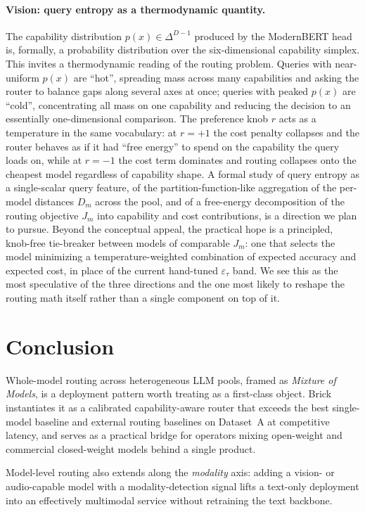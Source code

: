 \documentclass[twocolumn,10pt,a4paper]{article}
\begin{document}
\paragraph{Vision: query entropy as a thermodynamic quantity.} The capability distribution $p(x){\in}\Delta^{D-1}$ produced by the ModernBERT head is, formally, a probability distribution over the six-dimensional capability simplex. This invites a thermodynamic reading of the routing problem. Queries with near-uniform $p(x)$ are ``hot'', spreading mass across many capabilities and asking the router to balance gaps along several axes at once; queries with peaked $p(x)$ are ``cold'', concentrating all mass on one capability and reducing the decision to an essentially one-dimensional comparison. The preference knob $r$ acts as a temperature in the same vocabulary: at $r{=}{+}1$ the cost penalty collapses and the router behaves as if it had ``free energy'' to spend on the capability the query loads on, while at $r{=}{-}1$ the cost term dominates and routing collapses onto the cheapest model regardless of capability shape. A formal study of query entropy as a single-scalar query feature, of the partition-function-like aggregation of the per-model distances $D_m$ across the pool, and of a free-energy decomposition of the routing objective $J_m$ into capability and cost contributions, is a direction we plan to pursue. Beyond the conceptual appeal, the practical hope is a principled, knob-free tie-breaker between models of comparable $J_m$: one that selects the model minimizing a temperature-weighted combination of expected accuracy and expected cost, in place of the current hand-tuned $\varepsilon_\tau$ band. We see this as the most speculative of the three directions and the one most likely to reshape the routing math itself rather than a single component on top of it.

\section{Conclusion}\label{sec:conclusion}
Whole-model routing across heterogeneous LLM pools, framed as \emph{Mixture of Models}, is a deployment pattern worth treating as a first-class object. Brick instantiates it as a calibrated capability-aware router that exceeds the best single-model baseline and external routing baselines on Dataset~A at competitive latency, and serves as a practical bridge for operators mixing open-weight and commercial closed-weight models behind a single product.

Model-level routing also extends along the \emph{modality} axis: adding a vision- or audio-capable model with a modality-detection signal lifts a text-only deployment into an effectively multimodal service without retraining the text backbone.
\end{document}
